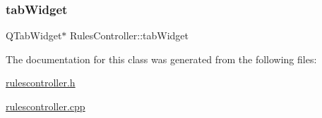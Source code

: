 \mbox{\label{class_rules_controller_afcb40145540839909f809fe27d24156c}} 
\subsubsection{\texorpdfstring{tab\+Widget}{tabWidget}}
{\footnotesize\ttfamily Q\+Tab\+Widget$\ast$ Rules\+Controller\+::tab\+Widget\hspace{0.3cm}{\ttfamily [private]}}



The documentation for this class was generated from the following files\+:\begin{DoxyCompactItemize}
\item 
\mbox{\hyperlink{rulescontroller_8h}{rulescontroller.\+h}}\item 
\mbox{\hyperlink{rulescontroller_8cpp}{rulescontroller.\+cpp}}\end{DoxyCompactItemize}
